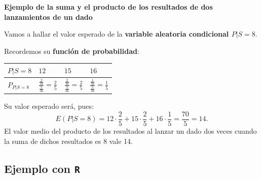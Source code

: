 \documentclass[]{book}
\begin{document}
\textbf{Ejemplo de la suma y el producto de los resultados de dos lanzamientos de un dado}

Vamos a hallar el valor esperado de la \textbf{variable aleatoria condicional \(P|S=8\)}.

Recordemos su \textbf{función de probabilidad}:

\begin{longtable}[]{@{}llll@{}}
\toprule
\begin{minipage}[b]{0.22\columnwidth}\raggedright
\(P|S=8\)\strut
\end{minipage} & \begin{minipage}[b]{0.22\columnwidth}\raggedright
\(12\)\strut
\end{minipage} & \begin{minipage}[b]{0.22\columnwidth}\raggedright
\(15\)\strut
\end{minipage} & \begin{minipage}[b]{0.22\columnwidth}\raggedright
\(16\)\strut
\end{minipage}\tabularnewline
\midrule
\endhead
\begin{minipage}[t]{0.22\columnwidth}\raggedright
\(P_{P|S=8}\)\strut
\end{minipage} & \begin{minipage}[t]{0.22\columnwidth}\raggedright
\(\frac{\frac{2}{36}}{\frac{5}{36}}=\frac{2}{5}\)\strut
\end{minipage} & \begin{minipage}[t]{0.22\columnwidth}\raggedright
\(\frac{\frac{2}{36}}{\frac{5}{36}}=\frac{2}{5}\)\strut
\end{minipage} & \begin{minipage}[t]{0.22\columnwidth}\raggedright
\(\frac{\frac{1}{36}}{\frac{5}{36}}=\frac{1}{5}\)\strut
\end{minipage}\tabularnewline
\bottomrule
\end{longtable}

Su valor esperado será, pues:
\[
E(P|S=8)=12\cdot \frac{2}{5}+15\cdot \frac{2}{5}+16\cdot \frac{1}{5}=\frac{70}{5}=14.
\]
El valor medio del producto de los resultados al lanzar un dado dos veces cuando la suma de dichos resultados es 8 vale 14.

\hypertarget{ejemplo-con-r-8}{%
\subsection{\texorpdfstring{Ejemplo con \texttt{R}}{Ejemplo con R}}\label{ejemplo-con-r-8}}
\end{document}
